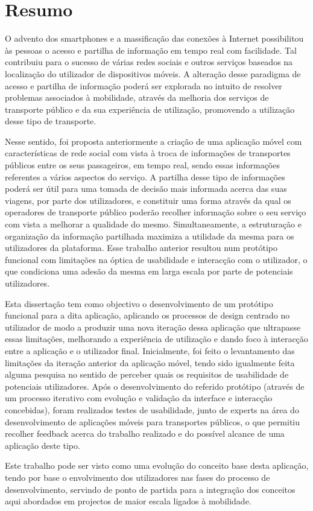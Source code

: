 \chapter*{Resumo}

O advento dos smartphones e a massificação das conexões à Internet possibilitou às pessoas o acesso e partilha de informação em tempo real com facilidade. Tal contribuiu para o sucesso de várias redes sociais e outros serviços baseados na localização do utilizador de dispositivos móveis. A alteração desse paradigma de acesso e partilha de informação poderá ser explorada no intuito de resolver problemas associados à mobilidade, através da melhoria dos serviços de transporte público e da sua experiência de utilização, promovendo a utilização desse tipo de transporte.

Nesse sentido, foi proposta anteriormente a criação de uma aplicação móvel com características de rede social com vista à troca de informações de transportes públicos entre os seus passageiros, em tempo real, sendo essas informações referentes a vários aspectos do serviço. A partilha desse tipo de informações poderá ser útil para uma tomada de decisão mais informada acerca das suas viagens, por parte dos utilizadores, e constituir uma forma através da qual os operadores de transporte público poderão recolher informação sobre o seu serviço com vista a melhorar a qualidade do mesmo. Simultaneamente, a estruturação e organização da informação partilhada maximiza a utilidade da mesma para os utilizadores da plataforma. Esse trabalho anterior resultou num protótipo funcional com limitações na óptica de usabilidade e interacção com o utilizador, o que condiciona uma adesão da mesma em larga escala por parte de potenciais utilizadores.

Esta dissertação tem como objectivo o desenvolvimento de um protótipo funcional para a dita aplicação, aplicando os processos de design centrado no utilizador de modo a produzir uma nova iteração dessa aplicação que ultrapasse essas limitações, melhorando a experiência de utilização e dando foco à interacção entre a aplicação e o utilizador final. Inicialmente, foi feito o levantamento das limitações da iteração anterior da aplicação móvel, tendo sido igualmente feita alguma pesquisa no sentido de perceber quais os requisitos de usabilidade de potenciais utilizadores. Após o desenvolvimento do referido protótipo (através de um processo iterativo com evolução e validação da interface e interacção concebidas), foram realizados testes de usabilidade, junto de experts na área do desenvolvimento de aplicações móveis para transportes públicos, o que permitiu recolher feedback acerca do trabalho realizado e do possível alcance de uma aplicação deste tipo. 

Este trabalho pode ser visto como uma evolução do conceito base desta aplicação, tendo por base o envolvimento dos utilizadores nas fases do processo de desenvolvimento, servindo de ponto de partida para a integração dos conceitos aqui abordados em projectos de maior escala ligados à mobilidade.
